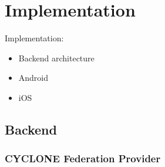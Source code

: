 \chapter{Implementation}
\label{cha:implementation}

Implementation:
\begin{itemize}
    \item Backend architecture
    \item Android
    \item iOS
\end{itemize}

\hline

\vspace{0.5cm}

\section{Backend}

\subsection{CYCLONE Federation Provider}